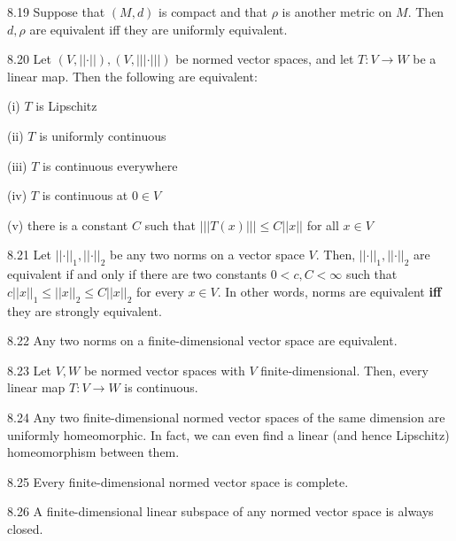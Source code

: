 \begin{proposition}{8.19}
    Suppose that $(M, d)$ is compact and that $\rho$ is another metric on $M$.
    Then $d, \rho$ are equivalent iff they are uniformly equivalent.
\end{proposition}

\begin{theorem}{8.20}
    Let $(V, \lvert \lvert \cdot \rvert \rvert), (V, \lvert \lvert \lvert \cdot \rvert \rvert \rvert)$ be normed vector spaces, and let $T: V \rightarrow W$ be a linear map.
    Then the following are equivalent:
    
    (i) $T$ is Lipschitz

    (ii) $T$ is uniformly continuous

    (iii) $T$ is continuous everywhere

    (iv) $T$ is continuous at $0 \in V$

    (v) there is a constant $C$ such that $\lvert \lvert \lvert T(x) \rvert \rvert \rvert \leq C \lvert \lvert x \rvert \rvert$ for all $x \in V$
\end{theorem}

\begin{corollary}{8.21}
    Let $\lvert \lvert \cdot \rvert \rvert_1, \lvert \lvert \cdot \rvert \rvert_2$ be any two norms on a vector space $V$.
    Then, $\lvert \lvert \cdot \rvert \rvert_1, \lvert \lvert \cdot \rvert \rvert_2$ are equivalent if and only if there are two constants $0 < c, C < \infty$ such that $c \lvert \lvert x \rvert \rvert_1 \leq \lvert \lvert x \rvert \rvert_2 \leq C \lvert \lvert x \rvert \rvert_2$ for every $x \in V$.
    In other words, norms are equivalent \textbf{iff} they are strongly equivalent.
\end{corollary}

\begin{theorem}{8.22}
    Any two norms on a finite-dimensional vector space are equivalent.
\end{theorem}

\begin{corollary}{8.23}
    Let $V, W$ be normed vector spaces with $V$ finite-dimensional.
    Then, every linear map $T: V \rightarrow W$ is continuous.
\end{corollary}

\begin{corollary}{8.24}
    Any two finite-dimensional normed vector spaces of the same dimension are uniformly homeomorphic.
    In fact, we can even find a linear (and hence Lipschitz) homeomorphism between them.
\end{corollary}

\begin{corollary}{8.25}
    Every finite-dimensional normed vector space is complete.
\end{corollary}

\begin{corollary}{8.26}
    A finite-dimensional linear subspace of any normed vector space is always closed.
\end{corollary}